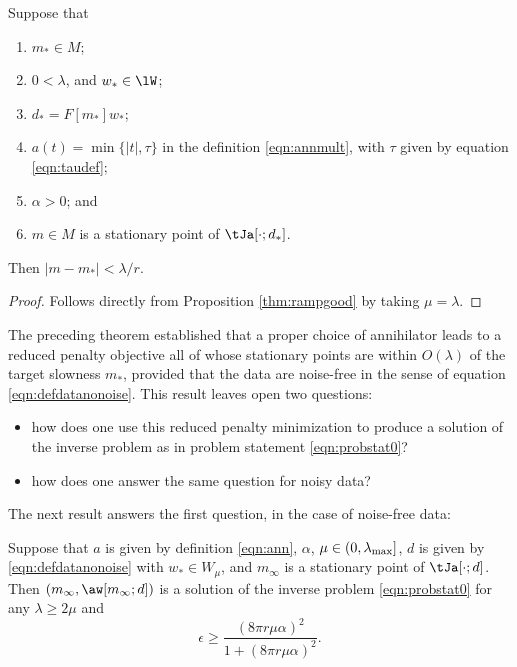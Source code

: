 \begin{theorem}
  \label{thm:rampreallygood}
  Suppose that
  \begin{enumerate}
  \item $m_* \in M$;
  \item $0 <  \lambda$, and $w_* \in \lW$;
  \item $d_* = F[m_*]w_*$;
  \item $a(t)=\min\{|t|,\tau\}$ in the definition \ref{eqn:annmult},
    with $\tau$ given by equation \ref{eqn:taudef}; 
  \item $\alpha > 0$; and
  \item$m \in M$ is a stationary point of $\tJa[\cdot;d_*]$.
  \end{enumerate}
  Then $|m-m_*| < \lambda /r$.
\end{theorem}

\begin{proof} Follows directly from Proposition \ref{thm:rampgood} by
  taking $\mu=\lambda$.
\end{proof}

The preceding theorem established that a proper choice of annihilator
leads to a reduced penalty objective all of whose stationary points
are within $O(\lambda)$ of the target slowness $m_*$, provided that
the data are noise-free in the sense of equation
\ref{eqn:defdatanonoise}. This result leaves open two questions:
\begin{itemize}
\item how does one use this reduced penalty minimization to produce
  a solution of the inverse problem as in problem statement
  \ref{eqn:probstat0}? 
\item how does one answer the same question for noisy data?
\end{itemize}

The next result answers the first question, in the case of noise-free data:
\begin{proposition}
  \label{thm:ipnonoisesuf}
  Suppose that $a$ is given by definition \ref{eqn:ann}, $\alpha$,
  $\mu \in (0,\lambda_{\rm max}]$,
  $d$ is given by
  \ref{eqn:defdatanonoise} with $w_* \in W_{\mu}$, and  $m_{\infty}$ is a stationary
  point of $\tJa[\cdot;d]$. Then $(m_{\infty},\aw[m_{\infty};d])$ is a
  solution of the inverse problem \ref{eqn:probstat0} for any $\lambda
  \ge 2\mu$ and
  \begin{equation}
    \label{eqn:estresidnorm}
    \epsilon \ge \frac{(8\pi r \mu \alpha)^2}{1 + (8\pi r \mu\alpha)^2}.
  \end{equation}
\end{proposition}

